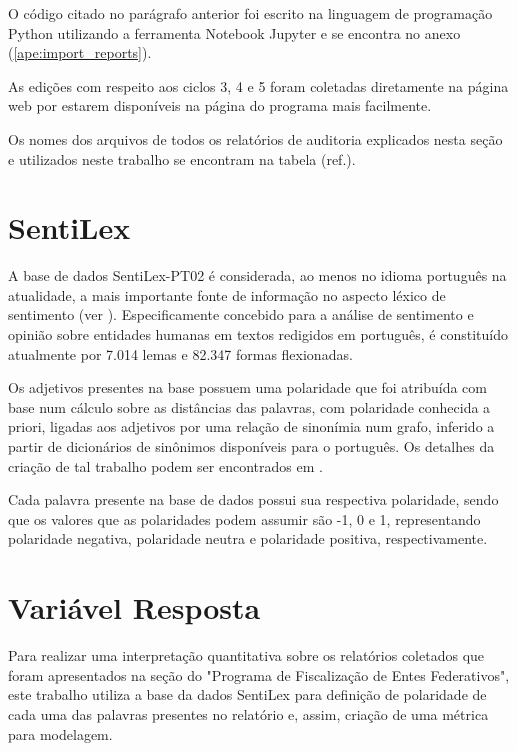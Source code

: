 O código citado no parágrafo anterior foi escrito na linguagem de programação Python utilizando a ferramenta Notebook Jupyter e se encontra no anexo (\ref{ape:import_reports}).

As edições com respeito aos ciclos 3, 4 e 5 foram coletadas diretamente na página web por estarem disponíveis na página do programa mais facilmente.

Os nomes dos arquivos de todos os relatórios de auditoria explicados nesta seção e utilizados neste trabalho se encontram na tabela (ref.).

\section{SentiLex}
\label{sec:sentilex}

A base de dados SentiLex-PT02 é considerada, ao menos no idioma português na atualidade, a mais importante fonte de informação no aspecto léxico de sentimento (ver \citet{BeckerTumitan2014}). Especificamente concebido para a análise de sentimento e opinião sobre entidades humanas em textos redigidos em português, é constituído atualmente por 7.014 lemas e 82.347 formas flexionadas.

Os adjetivos presentes na base possuem uma polaridade que foi atribuída com base num cálculo sobre as distâncias das palavras, com polaridade conhecida a priori, ligadas aos adjetivos por uma relação de sinonímia num grafo, inferido a partir de dicionários de sinônimos disponíveis para o português. Os detalhes da criação de tal trabalho podem ser encontrados em \citet{BeckerTumitan2014}.

Cada palavra presente na base de dados possui sua respectiva polaridade, sendo que os valores que as polaridades podem assumir são -1, 0 e 1, representando polaridade negativa, polaridade neutra e polaridade positiva, respectivamente.

\section{Variável Resposta}
\label{sec:variavel_resposta}

Para realizar uma interpretação quantitativa sobre os relatórios coletados que foram apresentados na seção do "Programa de Fiscalização de Entes Federativos", este trabalho utiliza a base da dados SentiLex para definição de polaridade de cada uma das palavras presentes no relatório e, assim, criação de uma métrica para modelagem.

